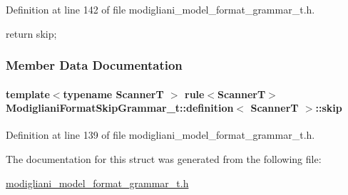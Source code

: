 Definition at line 142 of file modigliani\_\-model\_\-format\_\-grammar\_\-t.h.




\begin{DoxyCode}
{ return skip; }
\end{DoxyCode}




\subsubsection{Member Data Documentation}
\paragraph[{skip}]{\setlength{\rightskip}{0pt plus 5cm}template$<$typename ScannerT $>$ rule$<$ScannerT$>$ {\bf ModiglianiFormatSkipGrammar\_\-t::definition}$<$ ScannerT $>$::{\bf skip}}\hfill\label{struct_modigliani_format_skip_grammar__t_1_1definition_a905c59a2501ed57862160b13cbfd53cd}


Definition at line 139 of file modigliani\_\-model\_\-format\_\-grammar\_\-t.h.



The documentation for this struct was generated from the following file:\begin{DoxyCompactItemize}
\item 
\hyperlink{modigliani__model__format__grammar__t_8h}{modigliani\_\-model\_\-format\_\-grammar\_\-t.h}\end{DoxyCompactItemize}
